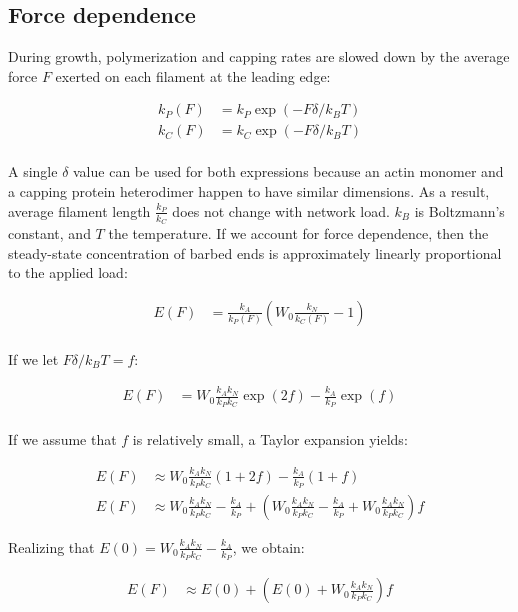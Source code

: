 \documentclass[11pt]{article}
\begin{document}
\subsection{Force dependence}\label{force-dependence}

During growth, polymerization and capping rates are slowed down by the
average force \(F\) exerted on each filament at the leading edge:

\begin{align*}
k_P (F) &= k_P \exp (-F\delta / k_B T) \\
k_C (F) &= k_C \exp (-F\delta / k_B T) \\
\end{align*}

A single \(\delta\) value can be used for both expressions because an
actin monomer and a capping protein heterodimer happen to have similar
dimensions. As a result, average filament length \(\frac{k_P}{k_C}\)
does not change with network load. \(k_B\) is Boltzmann's constant, and
\(T\) the temperature. If we account for force dependence, then the
steady-state concentration of barbed ends is approximately linearly
proportional to the applied load:

\begin{align*}
E(F) &= \frac{k_A}{k_P(F)}(W_0 \frac{k_N}{k_C(F)} - 1) \\
\end{align*}

If we let \(F\delta / k_B T = f\):

\begin{align*}
E(F) &= W_0 \frac{k_A k_N}{k_P k_C} \exp (2f) - \frac{k_A}{k_P} \exp (f) \\
\end{align*}

If we assume that \(f\) is relatively small, a Taylor expansion yields:

\begin{align*}
E(F) &\approx W_0 \frac{k_A k_N}{k_P k_C} (1 + 2f) - \frac{k_A}{k_P} (1 + f) \\
E(F) &\approx W_0 \frac{k_A k_N}{k_P k_C} - \frac{k_A}{k_P} + (W_0 \frac{k_A k_N}{k_P k_C} - \frac{k_A}{k_P} + W_0 \frac{k_A k_N}{k_P k_C} )f
\end{align*}

Realizing that \(E(0) = W_0 \frac{k_A k_N}{k_P k_C} - \frac{k_A}{k_P}\),
we obtain:

\begin{align*}
E(F) &\approx E(0) + (E(0) + W_0 \frac{k_A k_N}{k_P k_C})f \\
\end{align*}
\end{document}
